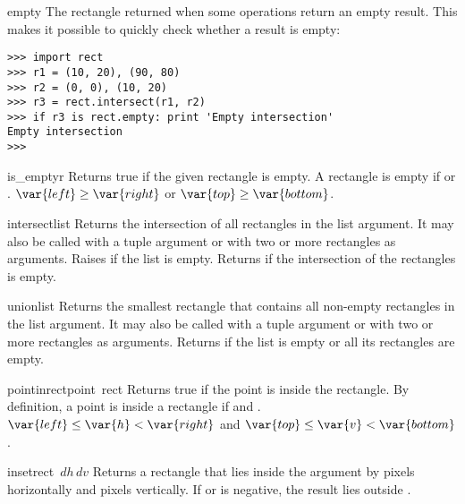 \begin{datadesc}{empty}
The rectangle returned when some operations return an empty result.
This makes it possible to quickly check whether a result is empty:

\bcode\begin{verbatim}
>>> import rect
>>> r1 = (10, 20), (90, 80)
>>> r2 = (0, 0), (10, 20)
>>> r3 = rect.intersect(r1, r2)
>>> if r3 is rect.empty: print 'Empty intersection'
Empty intersection
>>> 
\end{verbatim}\ecode
\end{datadesc}

\begin{funcdesc}{is_empty}{r}
Returns true if the given rectangle is empty.
A rectangle
is empty if
\iftexi
{} or .
\else
$\var{left} \geq \var{right}$ or $\var{top} \geq \var{bottom}$.
\fi
\end{funcdesc}

\begin{funcdesc}{intersect}{list}
Returns the intersection of all rectangles in the list argument.
It may also be called with a tuple argument or with two or more
rectangles as arguments.
Raises
if the list is empty.
Returns
if the intersection of the rectangles is empty.
\end{funcdesc}

\begin{funcdesc}{union}{list}
Returns the smallest rectangle that contains all non-empty rectangles in
the list argument.
It may also be called with a tuple argument or with two or more
rectangles as arguments.
Returns
if the list is empty or all its rectangles are empty.
\end{funcdesc}

\begin{funcdesc}{pointinrect}{point\, rect}
Returns true if the point is inside the rectangle.
By definition, a point
is inside a rectangle
 if
\iftexi
{} and
.
\else
$\var{left} \leq \var{h} < \var{right}$ and
$\var{top} \leq \var{v} < \var{bottom}$.
\fi
\end{funcdesc}

\begin{funcdesc}{inset}{rect\, \(dh\, dv\)}
Returns a rectangle that lies inside the
argument by
pixels horizontally
and
pixels
vertically.
If
or
is negative, the result lies outside
.
\end{funcdesc}

